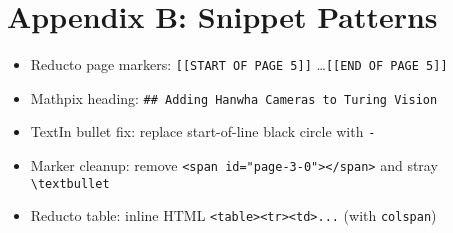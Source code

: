 \documentclass[11pt,a4paper]{article}
\begin{document}
\section*{Appendix B: Snippet Patterns}

\begin{itemize}[leftmargin=1.2em]
  \item Reducto page markers: \verb|[[START OF PAGE 5]]| \ldots \verb|[[END OF PAGE 5]]|
  \item Mathpix heading: \verb|## Adding Hanwha Cameras to Turing Vision|
  \item TextIn bullet fix: replace start-of-line black circle with \verb|- |
  \item Marker cleanup: remove \verb|<span id="page-3-0"></span>| and stray \verb|\textbullet|
  \item Reducto table: inline HTML \verb|<table><tr><td>...| (with \verb|colspan|)
\end{itemize}
\end{document}

